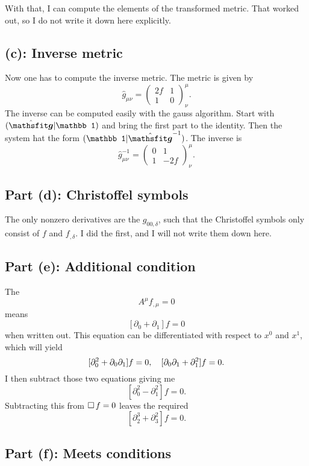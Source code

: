With that, I can compute the elements of the transformed metric. That worked
out, so I do not write it down here explicitly.

\subsection*{(c): Inverse metric}

Now one has to compute the inverse metric. The metric is given by
\[
    \hat g_{\mu\nu}
    =
    \begin{pmatrix}
        2f & 1 \\
        1 & 0
    \end{pmatrix}^\mu_\nu.
\]
The inverse can be computed easily with the gauss algorithm. Start with
$(\hat{\tens g} | \mathbb 1)$ and bring the first part to the identity. Then
the system hat the form $(\mathbb 1 | \hat{\tens g}^{-1})$. The inverse is
\[
    \hat g_{\mu\nu}^{-1}
    =
    \begin{pmatrix}
        0 & 1 \\
        1 & -2f
    \end{pmatrix}^\mu_\nu.
\]

\subsection*{Part (d): Christoffel symbols}

The only nonzero derivatives are the $g_{00,\delta}$, such that the Christoffel
symbols only consist of $f$ and $f_{,\delta}$. I did the first, and I will not
write them down here.

\subsection*{Part (e): Additional condition}

The
\[
    A^\mu f_{,\mu} = 0
\]
means
\[
    [\partial_0 + \partial_1] f = 0
\]
when written out. This equation can be differentiated with respect to $x^0$ and
$x^1$, which will yield
\[
    [\partial_0^2 + \partial_0 \partial_1] f = 0
    ,\quad
    [\partial_0 \partial_1 + \partial_1^2] f = 0.
\]
I then subtract those two equations giving me
\[
    [\partial_0^2 - \partial_1^2] f = 0.
\]
Subtracting this from $\operatorname{\Box} f = 0$ leaves the required
\[
    [\partial_2^3 + \partial_3^2] f = 0.
\]

\subsection*{Part (f): Meets conditions}

